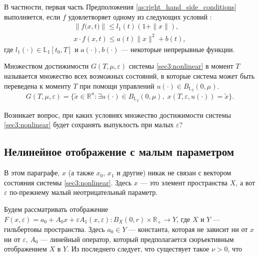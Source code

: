 \documentclass[../main.tex]{subfiles}
\begin{document}
В частности, первая часть Предположения \ref{as:right_hand_side_conditions} выполняется, если  $f$ удовлетворяет одному из следующих условий \cite{Fillipov2}:
\begin{gather}\label{sublinear_growth}
	\left\|f\big(x,t\big) \right\| \leqslant l_1(t) (1 + \|x\|), \\ 
	x \cdot f(x,t) \leqslant a(t) \|x\|^2 + b(t),
\end{gather}
где $l_1(\cdot) \in \mathbb{L}_1[t_0,T]$ и $a(\cdot), b(\cdot)$ --- некоторые непрерывные функции.

\begin{definition} 
	Множеством достижимости $G(T,\mu,\varepsilon) $ системы \eqref{sec3:nonlinear} в момент $T$ называется множество всех возможных состояний, в которые система может быть переведена  к моменту $T$ при помощи управлений  $ u(\cdot) \in B_{\mathbb{L}_2}(0,\mu) $.
	\begin{gather*}
		G(T,\mu,\varepsilon) =\{\widetilde{x}\in \mathbb{R}^n:\exists u(\cdot)\in B_{\mathbb{L}_2}(0,\mu),\; x(T,\varepsilon,u(\cdot)) = \widetilde{x}\}.
	\end{gather*}
\end{definition} 
Возникает вопрос, при каких условиях множество достижимости системы \eqref{sec3:nonlinear} будет сохранять выпуклость при малых $\varepsilon$?

\subsection{Нелинейное отображение с малым параметром}

В этом параграфе, $x$ (а также $x_0$, $x_1$ и другие) никак не связан с вектором состояния системы \eqref{sec3:nonlinear}.
Здесь $x$ --- это элемент пространства $X$, а вот $\varepsilon$ по-прежнему малый неотрицательный параметр.

Будем рассматривать отображение $F(x, \varepsilon) = a_0 + A_0x + \varepsilon A_1(x,\varepsilon): B_X(0, r) \times \mathbb{R}_+ \rightarrow Y$, где $X$ и $Y$ --- гильбертовы пространства.
Здесь $a_0 \in Y$ --- константа, которая не зависит ни от $x$ ни от $\varepsilon$, $A_0$ --- линейный оператор, который предполагается сюръективным отображением $X$ в $Y$. 
Из последнего следует, что существует такое $\nu > 0$, что
\end{document}
